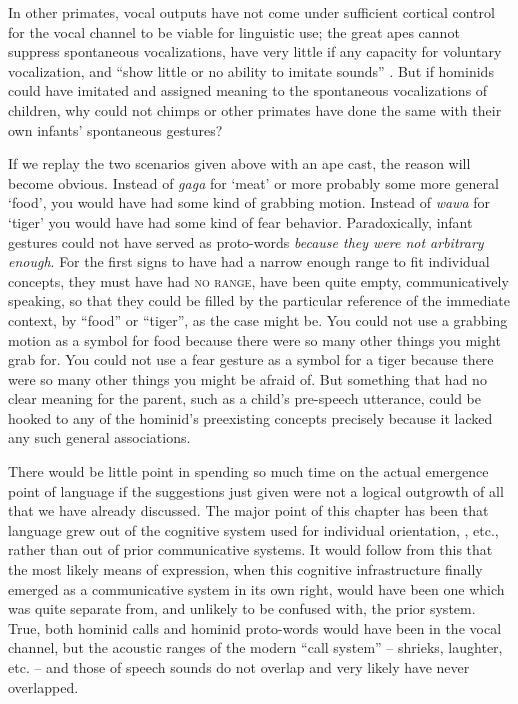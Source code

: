 In other primates, vocal outputs have not come under sufficient cortical control for the vocal channel to be viable for linguistic use; the great apes cannot suppress spontaneous vocalizations, have very little if any capacity for voluntary vocalization, and ``show little or no ability to imitate sounds'' \citep{Dingwall1979}. But if hominids could have imitated and assigned meaning to the spontaneous vocalizations of children, why could not chimps or other primates have done the same with their own infants' spontaneous gestures?


If we replay the two scenarios given above with an ape cast, the reason will become obvious. Instead of \textit{gaga} for `meat' or more probably some more general `food', you would have had some kind of grabbing motion. Instead of \textit{wawa} for `tiger' you would have had some kind of fear behavior. Paradoxically, infant gestures could not have served as proto-words \textit{because they were not arbitrary enough}. For the first signs to have had a narrow enough range to fit individual concepts, they must have had \textsc{no range}, have been quite empty, communicatively speaking, so that they could be filled by the particular reference of the immediate context, by ``food'' or ``tiger'', as the case might be. You could not use a grabbing motion as a symbol for food because there were so many other things you might grab for. You could not use a fear gesture as a symbol for a tiger because there were so many other things you might be afraid of. But something that had no clear meaning for the parent, such as a child's pre-speech utterance, could be hooked to any of the hominid's preexisting concepts precisely because it lacked any such general associations.

There would be little point in spending so much time on the actual emergence point of language if the suggestions just given were not a logical outgrowth of all that we have already discussed. The major point of this chapter has been that language grew out of the cognitive system used for individual orientation, , etc., rather than out of prior communicative systems. It would follow from this that the most likely means of expression, when this cognitive infrastructure finally emerged as a communicative system in its own right, would have been one which was quite separate from, and unlikely to be confused with, the prior system. True, both hominid calls and hominid proto-words would have been in the vocal channel, but the acoustic ranges of the modern ``call system'' -- shrieks, laughter, etc. -- and those of speech sounds do not overlap and very likely have never overlapped.

